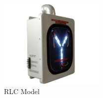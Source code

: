 \begin{figure}[ht!]
\includegraphics[keepaspectratio=true,width=2in]{./figures/regression/rlcModel.jpg}
\centering
\caption{RLC Model}
\label{fig:rlcModel}
\end{figure}

